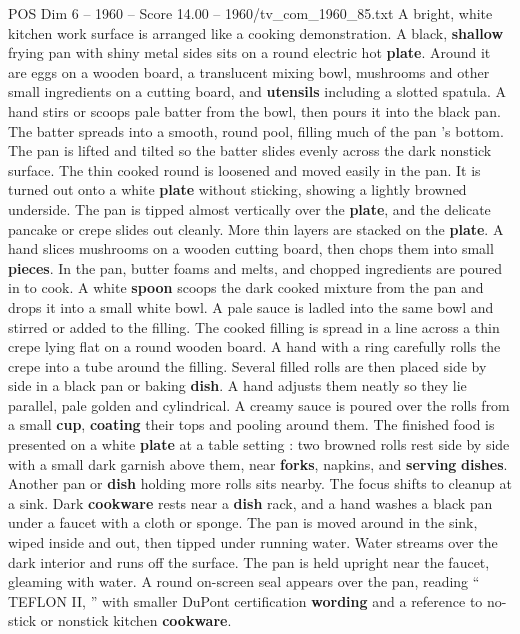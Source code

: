 \begin{textsample}{POS Dim 6 – 1960 – Score 14.00 – 1960/tv\_com\_1960\_85.txt}  \label{ex:f6_pos_027}
A bright, white kitchen work surface is arranged like a cooking demonstration.
A black, \textbf{shallow} frying pan with shiny metal sides sits on a round electric hot \textbf{plate}.
Around it are eggs on a wooden board, a translucent mixing bowl, mushrooms and other small ingredients on a cutting board, and \textbf{utensils} including a slotted spatula.
A hand stirs or scoops pale batter from the bowl, then pours it into the black pan.
The batter spreads into a smooth, round pool, filling much of the pan ’s bottom.
The pan is lifted and tilted so the batter slides evenly across the dark nonstick surface.
The thin cooked round is loosened and moved easily in the pan.
It is turned out onto a white \textbf{plate} without sticking, showing a lightly browned underside.
The pan is tipped almost vertically over the \textbf{plate}, and the delicate pancake or crepe slides out cleanly.
More thin layers are stacked on the \textbf{plate}.
A hand slices mushrooms on a wooden cutting board, then chops them into small \textbf{pieces}.
In the pan, butter foams and melts, and chopped ingredients are poured in to cook.
A white \textbf{spoon} scoops the dark cooked mixture from the pan and drops it into a small white bowl.
A pale sauce is ladled into the same bowl and stirred or added to the filling.
The cooked filling is spread in a line across a thin crepe lying flat on a round wooden board.
A hand with a ring carefully rolls the crepe into a tube around the filling.
Several filled rolls are then placed side by side in a black pan or baking \textbf{dish}.
A hand adjusts them neatly so they lie parallel, pale golden and cylindrical.
A creamy sauce is poured over the rolls from a small \textbf{cup}, \textbf{coating} their tops and pooling around them.
The finished food is presented on a white \textbf{plate} at a table setting : two browned rolls rest side by side with a small dark garnish above them, near \textbf{forks}, napkins, and \textbf{serving} \textbf{dishes}.
Another pan or \textbf{dish} holding more rolls sits nearby.
The focus shifts to cleanup at a sink.
Dark \textbf{cookware} rests near a \textbf{dish} rack, and a hand washes a black pan under a faucet with a cloth or sponge.
The pan is moved around in the sink, wiped inside and out, then tipped under running water.
Water streams over the dark interior and runs off the surface.
The pan is held upright near the faucet, gleaming with water.
A round on-screen seal appears over the pan, reading “ TEFLON II, ” with smaller DuPont certification \textbf{wording} and a reference to no-stick or nonstick kitchen \textbf{cookware}.

\end{textsample}
